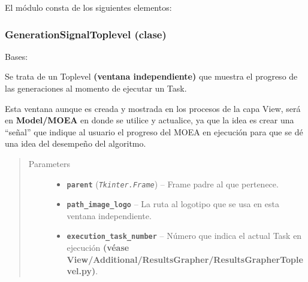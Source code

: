 \documentclass[letterpaper,10pt,english]{sphinxmanual}
\begin{document}
El módulo consta de los siguientes elementos:


\subsubsection{GenerationSignalToplevel (clase)}
\label{View/Additional/GenerationSignal/GenerationSignal:generationsignaltoplevel-clase}\label{View/Additional/GenerationSignal/GenerationSignal::doc}\label{View/Additional/GenerationSignal/GenerationSignal:module-View.Additional.GenerationSignal.GenerationSignalToplevel}

\begin{fulllineitems}
\label{View/Additional/GenerationSignal/GenerationSignal:View.Additional.GenerationSignal.GenerationSignalToplevel.GenerationSignalToplevel}
Bases: 

\begin{DUlineblock}{0em}
\item[] Se trata de un Toplevel \textbf{(ventana independiente)} que muestra el progreso de las generaciones
al momento de ejecutar un Task.
\item[] Esta ventana aunque es creada y mostrada en los procesos de la capa View, será en \textbf{Model/MOEA}
en donde se utilice y actualice, ya que la idea es crear una ``señal'' que indique al usuario el progreso
del MOEA en ejecución para que se dé una idea del desempeño del algoritmo.
\end{DUlineblock}
\begin{quote}\begin{description}
\item[{Parameters}] \leavevmode\begin{itemize}
\item {} 
\textbf{\texttt{parent}} (\emph{\texttt{Tkinter.Frame}}) -- Frame padre al que pertenece.

\item {} 
\textbf{\texttt{path\_image\_logo}} -- La ruta al logotipo que se usa en esta ventana independiente.

\item {} 
\textbf{\texttt{execution\_task\_number}} -- Número que indica el actual Task en ejecución 
\textbf{(véase View/Additional/ResultsGrapher/ResultsGrapherToplevel.py)}.


\end{itemize}
\end{description}
\end{quote}
\end{fulllineitems}
\end{document}
